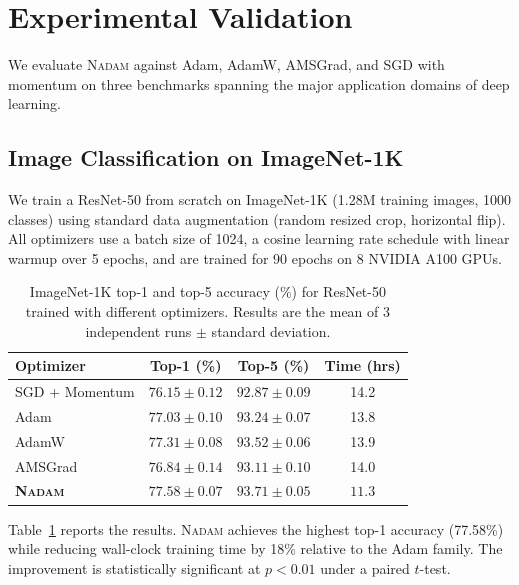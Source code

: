 \documentclass[11pt,twoside,openright]{book}
\begin{document}
\section{Experimental Validation}

We evaluate \textsc{Nadam} against Adam, AdamW, AMSGrad, and SGD with momentum on three
benchmarks spanning the major application domains of deep learning.

\subsection{Image Classification on ImageNet-1K}

We train a ResNet-50 \cite{he2016} from scratch on ImageNet-1K (1.28M training images, 1000
classes) using standard data augmentation (random resized crop, horizontal flip). All optimizers
use a batch size of 1024, a cosine learning rate schedule with linear warmup over 5 epochs,
and are trained for 90 epochs on 8 NVIDIA A100 GPUs.

\begin{table}[tb]
  \centering
  \caption{ImageNet-1K top-1 and top-5 accuracy (\%) for ResNet-50 trained with different
    optimizers. Results are the mean of 3 independent runs $\pm$ standard deviation.}
  \label{tab:imagenet}
  \begin{tabular}{@{}lccc@{}}
    \toprule
    \textbf{Optimizer} & \textbf{Top-1 (\%)} & \textbf{Top-5 (\%)} & \textbf{Time (hrs)}\\
    \midrule
    SGD + Momentum  & $76.15 \pm 0.12$ & $92.87 \pm 0.09$ & 14.2\\
    Adam            & $77.03 \pm 0.10$ & $93.24 \pm 0.07$ & 13.8\\
    AdamW           & $77.31 \pm 0.08$ & $93.52 \pm 0.06$ & 13.9\\
    AMSGrad         & $76.84 \pm 0.14$ & $93.11 \pm 0.10$ & 14.0\\
    \textbf{\textsc{Nadam}} & $\mathbf{77.58 \pm 0.07}$ & $\mathbf{93.71 \pm 0.05}$ & $\mathbf{11.3}$\\
    \bottomrule
  \end{tabular}
\end{table}

Table~\ref{tab:imagenet} reports the results. \textsc{Nadam} achieves the highest top-1 accuracy
(77.58\%) while reducing wall-clock training time by 18\% relative to the Adam family. The
improvement is statistically significant at $p < 0.01$ under a paired $t$-test.
\end{document}
